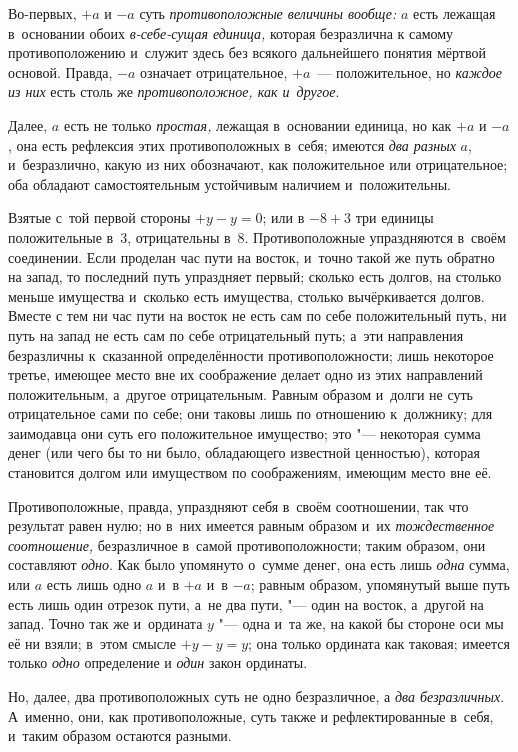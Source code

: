 Во-первых, $+a$ и $-a$ суть {\em противоположные величины вообще:}
$a$ есть лежащая в~основании обоих
{\em в-себе-сущая единица,} которая безразлична к
самому противоположению и~служит здесь без всякого дальнейшего понятия
мёртвой основой. Правда, $-a$ означает
отрицательное, $+a$~--- положительное, но
{\em каждое из них} есть столь же {\em противоположное, как и~другое}.

Далее, $a$ есть не только {\em простая,} лежащая в~основании единица, но как
$+a$ и $-a$, она есть рефлексия этих противоположных в~себя; имеются {\em два
разных} $a$, и~безразлично, какую из них обозначают, как положительное или
отрицательное; оба обладают самостоятельным устойчивым наличием и~положительны.

Взятые с~той первой стороны $+y-y=0$; или в $-8+3$ три единицы положительные
в~3, отрицательны в~8. Противоположные упраздняются в~своём соединении. Если
проделан час пути на восток, и~точно такой же путь обратно на запад, то
последний путь упраздняет первый; сколько есть долгов, на столько меньше
имущества и~сколько есть имущества, столько вычёркивается долгов. Вместе с
тем ни час пути на восток не есть сам по себе положительный путь, ни путь
на запад не есть сам по себе отрицательный путь; а~эти направления
безразличны к~сказанной определённости противоположности; лишь некоторое
третье, имеющее место вне их соображение делает одно из этих направлений
положительным, а~другое отрицательным. Равным образом и~долги не суть
отрицательное сами по себе; они таковы лишь по отношению к~должнику; для
заимодавца они суть его положительное имущество; это "--- некоторая сумма
денег (или чего бы то ни было, обладающего известной ценностью), которая
становится долгом или имуществом по соображениям, имеющим место вне её.

Противоположные, правда, упраздняют себя в~своём соотношении, так что
результат равен нулю; но в~них имеется равным образом и~их
{\em тождественное соотношение,} безразличное в~самой
противоположности; таким образом, они составляют
{\em одно}. Как было упомянуто о~сумме денег, она есть
лишь {\em одна} сумма, или $a$ есть лишь одно $a$ и~в $+a$ и~в $-a$; равным
образом, упомянутый выше путь есть лишь один отрезок пути, а~не два
пути, "--- один на восток, а~другой на запад. Точно так же и~ордината
$y$ "--- одна и~та же, на какой бы стороне оси мы её ни
взяли; в~этом смысле $+y-y=y$; она только ордината как таковая;
имеется только {\em одно} определение и {\em один} закон ординаты.

Но, далее, два противоположных суть не одно безразличное, а
{\em два безразличных}. А~именно, они, как противоположные, суть также
и рефлектированные в~себя, и~таким образом остаются разными.

